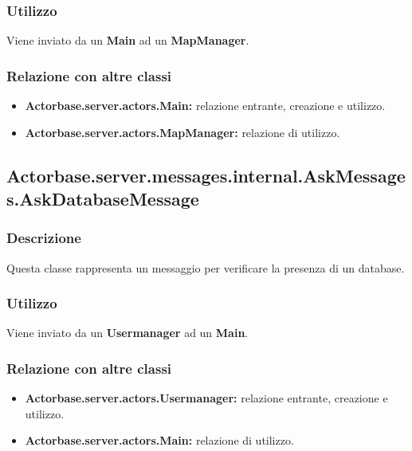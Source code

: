 \documentclass[a4paper]{article}
\begin{document}
			\subsubsection{Utilizzo}
				Viene inviato da un \textbf{Main} ad un \textbf{MapManager}.
				
			\subsubsection{Relazione con altre classi}
				\begin{itemize}
					\item \textbf{Actorbase.server.actors.Main:} relazione entrante, creazione e utilizzo.
					\item \textbf{Actorbase.server.actors.MapManager:} relazione di utilizzo.
				\end{itemize}
				
		\subsection{Actorbase.server.messages.internal.AskMessages.AskDatabaseMessage}
			\subsubsection{Descrizione}
				Questa classe rappresenta un messaggio per verificare la presenza di un database.
				
			\subsubsection{Utilizzo}
				Viene inviato da un \textbf{Usermanager} ad un \textbf{Main}.
				
			\subsubsection{Relazione con altre classi}
				\begin{itemize}
					\item \textbf{Actorbase.server.actors.Usermanager:} relazione entrante, creazione e utilizzo.
					\item \textbf{Actorbase.server.actors.Main:} relazione di utilizzo.
				\end{itemize}				
				
				
				
\end{document}
